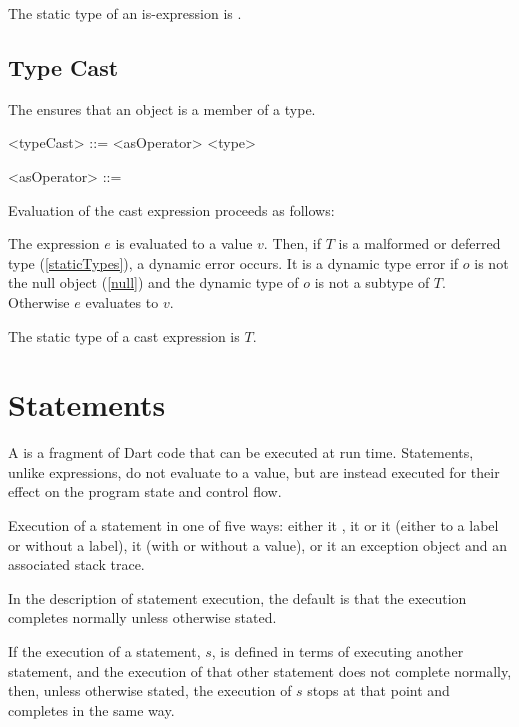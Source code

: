 \documentclass[makeidx]{article}
\begin{document}
\LMHash{}%
The static type of an is-expression is .


\subsection{Type Cast}

\LMHash{}%
The  ensures that an object is a member of a type.

\begin{grammar}
<typeCast> ::= <asOperator> <type>

<asOperator> ::= \AS{}
\end{grammar}

\LMHash{}%
 Evaluation of the cast expression  proceeds as follows:

\LMHash{}%
The expression $e$ is evaluated to a value $v$.
Then, if $T$ is a malformed or deferred type (\ref{staticTypes}), a dynamic error occurs.
It is a dynamic type error if $o$ is not the null object (\ref{null})
and the dynamic type of $o$ is not a subtype of $T$.
Otherwise $e$ evaluates to $v$.

\LMHash{}%
The static type of a cast expression  is $T$.


\section{Statements}

\LMHash{}%
A  is a fragment of Dart code that can be executed at run time.
Statements, unlike expressions, do not evaluate to a value, but are instead executed for their effect on the program state and control flow.

\label{completion}
Execution of a statement 
in one of five ways:
either it
,
it 
or it 
(either to a label or without a label),
it  (with or without a value),
or it 
an exception object and an associated stack trace.

In the description of statement execution, the default is that the execution
completes normally unless otherwise stated.

If the execution of a statement, $s$, is defined in terms of executing
another statement,
and the execution of that other statement does not complete normally,
then, unless otherwise stated, the execution of $s$ stops
at that point and completes in the same way.
\end{document}
